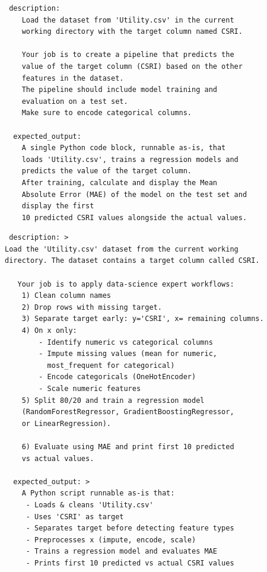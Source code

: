 \begin{tcolorbox}[ left=2pt,   right=2pt,   top=2pt,   bottom=2pt, colback=gray!5,colframe=black!40,title={Initial prompt (No Expertise)}]
\scriptsize
\setlength{\baselineskip}{0.6\baselineskip} \begin{verbatim}
 description:
    Load the dataset from 'Utility.csv' in the current  
    working directory with the target column named CSRI.
    
    Your job is to create a pipeline that predicts the 
    value of the target column (CSRI) based on the other 
    features in the dataset.
    The pipeline should include model training and 
    evaluation on a test set.
    Make sure to encode categorical columns.

  expected_output:
    A single Python code block, runnable as-is, that 
    loads 'Utility.csv', trains a regression models and 
    predicts the value of the target column.
    After training, calculate and display the Mean 
    Absolute Error (MAE) of the model on the test set and 
    display the first
    10 predicted CSRI values alongside the actual values.
\end{verbatim}
\end{tcolorbox}


\begin{tcolorbox}[ left=2pt,   right=2pt,   top=2pt,   bottom=2pt, colback=gray!5,colframe=black!40,title={Expertise instruction prompt}]
\scriptsize
\setlength{\baselineskip}{0.6\baselineskip} \begin{verbatim}
 description: >
Load the 'Utility.csv' dataset from the current working 
directory. The dataset contains a target column called CSRI.
    
   Your job is to apply data-science expert workflows:
    1) Clean column names
    2) Drop rows with missing target.
    3) Separate target early: y='CSRI', x= remaining columns.
    4) On x only:
        - Identify numeric vs categorical columns
        - Impute missing values (mean for numeric, 
          most_frequent for categorical)
        - Encode categoricals (OneHotEncoder)
        - Scale numeric features
    5) Split 80/20 and train a regression model
    (RandomForestRegressor, GradientBoostingRegressor, 
    or LinearRegression).
    
    6) Evaluate using MAE and print first 10 predicted 
    vs actual values.

  expected_output: >
    A Python script runnable as-is that:
     - Loads & cleans 'Utility.csv'
     - Uses 'CSRI' as target
     - Separates target before detecting feature types
     - Preprocesses x (impute, encode, scale)
     - Trains a regression model and evaluates MAE
     - Prints first 10 predicted vs actual CSRI values
\end{verbatim}
\end{tcolorbox}



